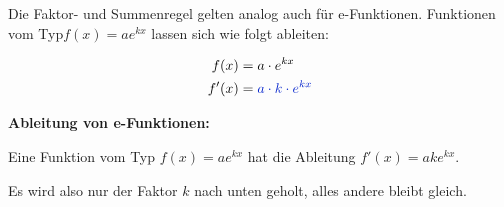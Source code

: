Die Faktor- und Summenregel gelten analog auch für e-Funktionen. Funktionen vom Typ\linebreak \(f(x)=ae^{kx}\) lassen sich wie folgt ableiten:

\bigskip

\begin{minipage}{\textwidth}
    \begin{minipage}{0.3\textwidth}
        \begin{align*}
            f(x)&=a\cdot e^{kx}\\
            f'(x)&=\textcolor{loes}{a\cdot k\cdot e^{kx}}
        \end{align*}
    \end{minipage}%
    \begin{minipage}{0.7\textwidth}
        \begin{tcolorbox}
	       \textbf{Ableitung von e-Funktionen:}

            \textcolor{loestc}{Eine Funktion vom Typ \(f(x)=ae^{kx}\) hat die Ableitung \(f'(x)=ake^{kx}\).}

            \textcolor{loestc}{Es wird also nur der Faktor \(k\) nach unten geholt, alles andere bleibt gleich.}
        \end{tcolorbox}
    \end{minipage}%
\end{minipage}

